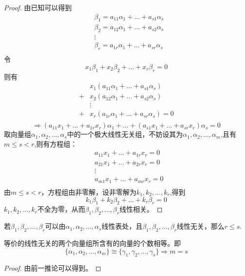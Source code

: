 \documentclass[blue,normal,cn]{elegantnote}
\begin{document}
\begin{proof}
由已知可以得到
    $$
        \begin{aligned}
            &β_1=a_{11} α_1+...+  a_{s1}α_s\\
            &β_2=a_{12} α_1+...+  a_{s2}α_s\\
            &\vdots\\
            &β_r=a_{1r} α_1+...+  a_{sr}α_s\\
        \end{aligned}
    $$
    令
    $$
        x_1β_1+x_2β_2+...+x_rβ_r=0
    $$
    则有
    $$
        \begin{aligned}
            &x_1(a_{11} α_1+...+  a_{s1}α_s)\\
            +&x_2(a_{12} α_1+...+  a_{s2}α_s)\\
            &\vdots\\
            +&x_r(a_{1r} α_1+...+  a_{sr}α_s)=0\\
        \end{aligned}
    $$
    $$
        \Rightarrow 
        (a_{11}x_1+...+a_{1r}x_r)α_1+...+(a_{s1}x_1+...+a_{sr}x_r)α_s=0
    $$
    取向量组$\alpha_1,\alpha_2,...,\alpha_s$中的一个极大线性无关组，不妨设其为$\alpha_1,\alpha_2,...,\alpha_m$,且有$m≤s<r$,则有方程组：
    $$
        \begin{aligned}
            &a_{11} x_1+...+  a_{1r}x_r=0\\
            &a_{21} x_1+...+  a_{2r}x_r=0\\
            &\vdots\\
            &a_{m1} x_1+...+  a_{mr}x_r=0\\
        \end{aligned}
    $$
    由$m≤s<r$，方程组由非零解，设非零解为$k_1,k_2,...,k_r$,得到
    $$
        k_1β_1+k_2β_2+...+k_rβ_r=0
    $$
    $k_1,k_2,...,k_r$不全为零，从而$β_1,β_2,...,β_r$线性相关。
\end{proof}


\begin{lemma} 
    \label{1}
    若$β_1,β_2,...,β_r$可以由$α_1,α_2,...,α_s$线性表处，且$β_1,β_2,...,β_r$线性无关，那么$r≤s$.
\end{lemma}

\begin{corollary}
   等价的线性无关的两个向量组所含有的向量的个数相等。即
   $$
    \{α_1,α_2,...,α_m\} \cong \{γ_1,γ_2,...,γ_s\} \Rightarrow m=s
   $$
\end{corollary}

\begin{proof}
    由前一推论可以得到。
\end{proof}
\end{document}
